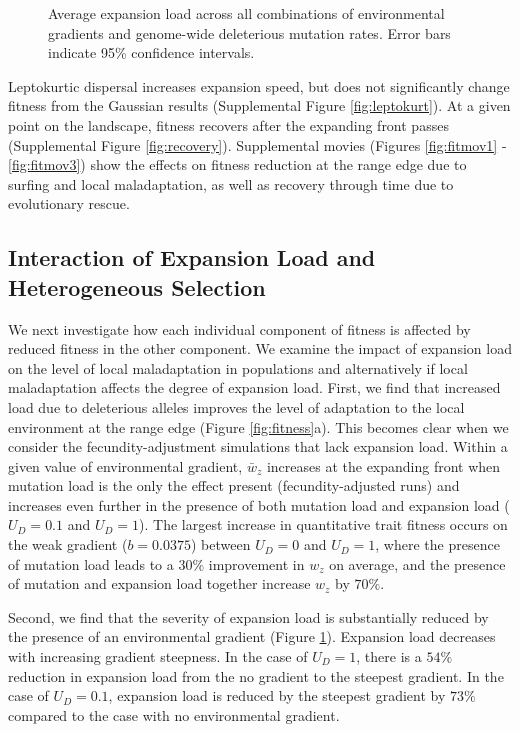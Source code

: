 \begin{figure}[h]
\centering
{}
\caption[~- Average expansion load.]{Average expansion load across all combinations of environmental gradients and genome-wide deleterious mutation rates. Error bars indicate 95\% confidence intervals.}
\label{fig:load}
\end{figure}


Leptokurtic dispersal increases expansion speed, but does not significantly change fitness from the Gaussian results (Supplemental Figure \ref{fig:leptokurt}). At a given point on the landscape, fitness recovers after the expanding front passes (Supplemental Figure \ref{fig:recovery}). Supplemental movies (Figures \ref{fig:fitmov1} - \ref{fig:fitmov3}) show the effects on fitness reduction at the range edge due to surfing and local maladaptation, as well as recovery through time due to evolutionary rescue. 


\subsection*{Interaction of Expansion Load and Heterogeneous Selection}

We next investigate how each individual component of fitness is affected by reduced fitness in the other component. We examine the impact of expansion load on the level of local maladaptation in populations and alternatively if local maladaptation affects the degree of expansion load. First, we find that increased load due to deleterious alleles improves the level of adaptation to the local environment at the range edge (Figure \ref{fig:fitness}a). This becomes clear when we consider the fecundity-adjustment simulations that lack expansion load. Within a given value of environmental gradient, $\bar{w}_z$ increases at the expanding front when mutation load is the only the effect present (fecundity-adjusted runs) and increases even further in the presence of both mutation load and expansion load  ($U_D = 0.1$ and $U_D = 1$). The largest increase in quantitative trait fitness occurs on the weak gradient ($b = 0.0375$) between $U_D = 0$ and $U_D = 1$, where the presence of mutation load leads to a $30\%$ improvement in $w_z$ on average, and the presence of mutation and expansion load together increase $w_z$ by $70\%$. 

Second, we find that the severity of expansion load is substantially reduced by the presence of an environmental gradient (Figure \ref{fig:load}). Expansion load decreases with increasing gradient steepness. In the case of $U_D = 1$, there is a $54\%$ reduction in expansion load from the no gradient to the steepest gradient. In the case of $U_D = 0.1$, expansion load is reduced by the steepest gradient by $73\%$ compared to the case with no environmental gradient. 


